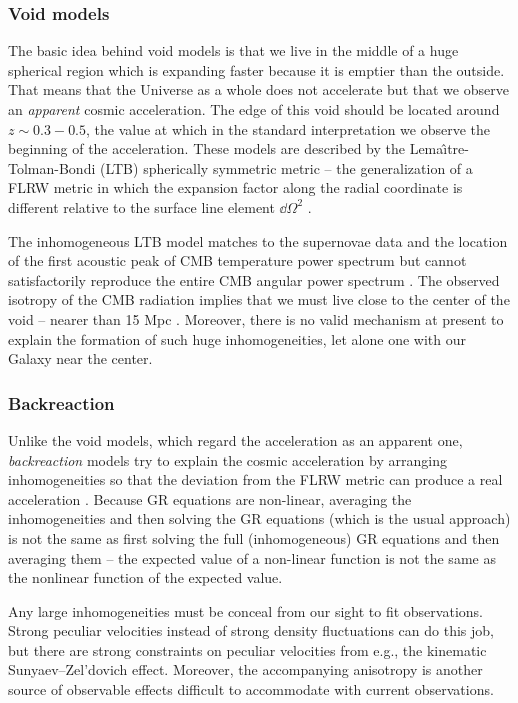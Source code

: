 \subsubsection{Void models}
The basic idea behind void models is that we live in the middle of a huge spherical region which is expanding faster because it is emptier than the outside. That means that the Universe as a whole does not accelerate but that we observe an \textit{apparent} cosmic acceleration. The edge of this void should be located around $z\sim0.3-0.5$, the value at which in the standard interpretation we observe the beginning of the acceleration. These models are described by the Lema\^\i tre-Tolman-Bondi (LTB) spherically symmetric metric -- the generalization of a FLRW metric in which the expansion factor along the radial coordinate is different relative to the surface line element $\dd\Omega^2$ \parencite{2013JCAP...02..047D,2006PhRvD..73h3519A}.

The inhomogeneous LTB model matches to the supernovae data and the location of the first acoustic peak of CMB temperature power spectrum but cannot satisfactorily reproduce the entire CMB angular power spectrum \parencite{2011JCAP...02..013C}. The observed isotropy of the CMB radiation implies that we must live close to the center of the void -- nearer than 15 Mpc \parencite{2006PhRvD..74j3520A}. Moreover, there is no valid mechanism at present to explain the formation of such huge inhomogeneities, let alone one with our Galaxy near the center.
\subsubsection{Backreaction}
Unlike the void models, which regard the acceleration as an apparent one, \textit{backreaction} models try to explain the cosmic acceleration by arranging inhomogeneities so that the deviation from the FLRW metric can produce a real acceleration \parencite{2011CQGra..28w5002S,2004JCAP...02..003R,2005PhRvD..72b3507M}. Because GR equations are non-linear, averaging the inhomogeneities and then solving the GR equations (which is the usual approach) is not the same as first solving the full (inhomogeneous) GR equations and then averaging them -- the expected value of a non-linear function is not the same as the nonlinear function of the expected value.

Any large inhomogeneities must be conceal from our sight to fit observations. Strong peculiar velocities instead of strong density fluctuations can do this job, but there are strong constraints on peculiar velocities from e.g., the kinematic Sunyaev--Zel'dovich effect. Moreover, the accompanying anisotropy is another source of observable effects difficult to accommodate with current observations.

